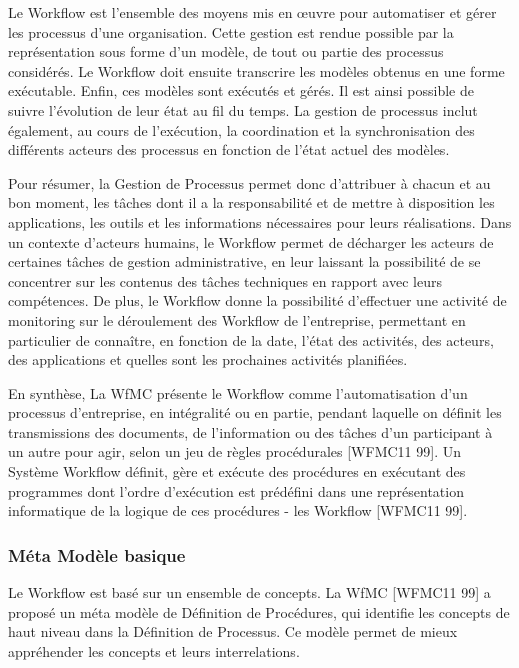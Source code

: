  	 Le Workflow est l’ensemble des moyens mis en œuvre pour automatiser et gérer les processus d’une organisation. Cette gestion est rendue possible par la représentation sous forme d’un modèle, de tout ou partie des processus considérés. Le Workflow doit ensuite transcrire les modèles obtenus en une forme exécutable. Enfin, ces modèles sont exécutés et gérés. Il est ainsi possible de suivre l’évolution de leur état au fil du temps. La gestion de processus inclut également, au cours de l’exécution, la coordination et la synchronisation des différents acteurs des processus en fonction de l’état actuel des modèles.
 	 
 	 Pour résumer, la Gestion de Processus permet donc d’attribuer à chacun et au bon moment, les tâches dont il a la responsabilité et de mettre à disposition les applications, les outils et les informations nécessaires pour leurs réalisations. Dans un contexte d’acteurs humains, le Workflow permet de décharger les acteurs de certaines tâches de gestion administrative, en leur laissant la possibilité de se concentrer sur les contenus des tâches techniques en rapport avec leurs compétences. De plus, le Workflow donne la possibilité d’effectuer une activité de monitoring sur le déroulement des Workflow de l’entreprise, permettant en particulier de connaître, en fonction de la date, l’état des activités, des acteurs, des applications et quelles sont les prochaines activités planifiées. 
 	 
 	 En synthèse, La WfMC présente le Workflow comme l’automatisation d’un processus d’entreprise, en intégralité ou en partie, pendant laquelle on définit les transmissions des documents, de l’information ou des tâches d’un participant à un autre pour agir, selon un jeu de règles procédurales [WFMC11 99]. Un Système Workflow définit, gère et exécute des procédures en exécutant des programmes dont l’ordre d’exécution est prédéfini dans une représentation informatique de la logique de ces procédures - les Workflow [WFMC11 99]. 
 	 
 	 \subsubsection{ Méta Modèle basique }
 	 Le Workflow est basé sur un ensemble de concepts. La WfMC [WFMC11 99] a proposé un méta modèle de Définition de Procédures, qui identifie les concepts de haut niveau dans la Définition de Processus. Ce modèle permet de mieux appréhender les concepts et leurs interrelations. 
 	 
